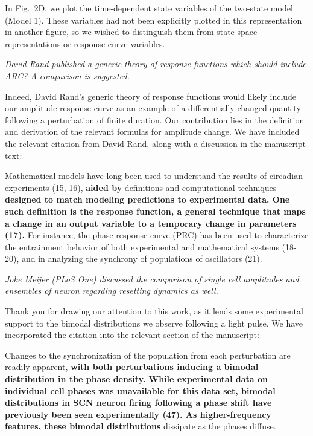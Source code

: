 \documentclass[11pt, letterpaper]{article}
\newenvironment{reviewer}{\itshape\color{gray}}{}
\newenvironment{manuscript}[1]{\begin{center}\begin{tcolorbox}[colback=green!5!white,colframe=green!75!black,width=0.8\textwidth,title={#1},breakable,fonttitle=\bfseries]}{\end{tcolorbox}\end{center}}
\begin{document}
In Fig.~2D, we plot the time-dependent state variables of the two-state model (Model 1).
These variables had not been explicitly plotted in this representation in another figure, so we wished to distinguish them from state-space representations or response curve variables.

\begin{reviewer}
David Rand published a generic theory of response functions which should include ARC?
A comparison is suggested. 
\end{reviewer}

Indeed, David Rand's generic theory of response functions would likely include our amplitude response curve as an example of a differentially changed quantity following a perturbation of finite duration.
Our contribution lies in the definition and derivation of the relevant formulas for amplitude change.
We have included the relevant citation from David Rand, along with a discussion in the manuscript text:

\begin{manuscript}{Page 3}
Mathematical models have long been used to understand the results of circadian experiments (15, 16), {\bfseries aided by} definitions and computational techniques {\bfseries designed to match modeling predictions to experimental data.
One such definition is the response function, a general technique that maps a change in an output variable to a temporary change in parameters (17).}
For instance, the phase response curve (PRC) has been used to characterize the entrainment behavior of both experimental and mathematical systems (18-20), and in analyzing the synchrony of populations of oscillators (21).
\end{manuscript}

\begin{reviewer}
Joke Meijer (PLoS One) discussed the comparison of single cell amplitudes and ensembles of neuron regarding resetting dynamics as well. 
\end{reviewer}
 
Thank you for drawing our attention to this work, as it lends some experimental support to the bimodal distributions we observe following a light pulse.
We have incorporated the citation into the relevant section of the manuscript:

\begin{manuscript}{Page 14}
Changes to the synchronization of the population from each perturbation are readily apparent, {\bfseries with both perturbations inducing a bimodal distribution in the phase density.
While experimental data on individual cell phases was unavailable for this data set, bimodal distributions in SCN neuron firing following a phase shift have previously been seen experimentally (47).
As higher-frequency features, these bimodal distributions} dissipate as the phases diffuse.
\end{manuscript}
\end{document}
